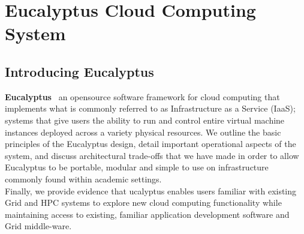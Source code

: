 \chapter{Eucalyptus Cloud Computing System}
\section{Introducing Eucalyptus}
{\bf Eucalyptus} \textendash\ an opensource software framework for cloud computing that implements what is commonly referred to as 
Infrastructure as a Service (IaaS); systems that give users the ability to run and control entire virtual machine instances deployed 
across a variety physical resources. We outline the basic principles of the Eucalyptus design, detail important operational aspects 
of the system, and discuss architectural trade-offs that we have made in order to allow Eucalyptus to be portable, modular and simple 
to use on infrastructure commonly found within academic settings.\\
Finally, we provide evidence that ucalyptus enables users familiar with existing Grid and HPC systems to explore new cloud computing 
functionality while maintaining access to existing, familiar application development software and Grid middle-ware.
